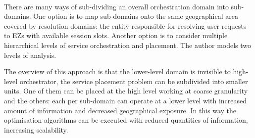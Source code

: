 \paragraph{}There are many ways of sub-dividing an overall orchestration domain into sub-domains. One option is to map sub-domains onto the same geographical area covered by resolution domains: the entity responsible for resolving user requests to EZs with available session slots. Another option is to consider multiple hierarchical levels of service orchestration and placement. The author models two levels of analysis.

The overview of this approach is that the lower-level domain is invisible to high-level orchestrator, the service placement problem can be subdivided into smaller units. One of them can be placed at the high level working at coarse granularity and the others: each per sub-domain can operate at a lower level with increased amount of information and decreased geographical exposure. In this way the optimisation algorithms can be executed with reduced quantities of information, increasing scalability. 